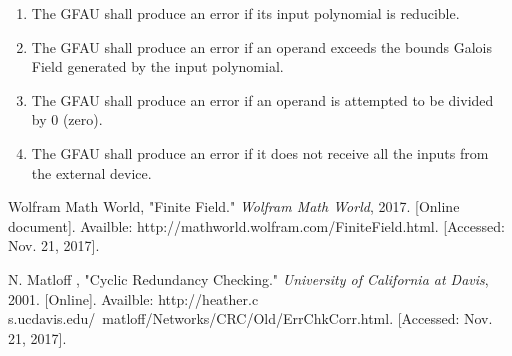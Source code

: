 \documentclass[12pt]{extarticle}
\begin{document}
        \begin{enumerate}[resume]

            \item The GFAU shall produce an error if its input polynomial
            is reducible.
            
            \item The GFAU shall produce an error if an operand exceeds the
            bounds Galois Field generated by the input polynomial.
            
            \item The GFAU shall produce an error if an operand is
            attempted to be divided by 0 (zero).
            
            \item The GFAU shall produce an error if it does not receive
            all the inputs from the external device.

        \end{enumerate}

        \begin{thebibliography}{2}
            Wolfram Math World, "Finite Field." \textit{Wolfram Math World},
            2017. [Online document]. Availble:
                  http://mathworld.wolfram.com/FiniteField.html. [Accessed:
                  Nov. 21, 2017].

            N. Matloff , "Cyclic Redundancy Checking." \textit{University of
               California at Davis}, 2001. [Online]. Availble: http://heather.c
               s.ucdavis.edu/~matloff/Networks/CRC/Old/ErrChkCorr.html.
               [Accessed: Nov. 21, 2017].
        \end{thebibliography}
\end{document}
